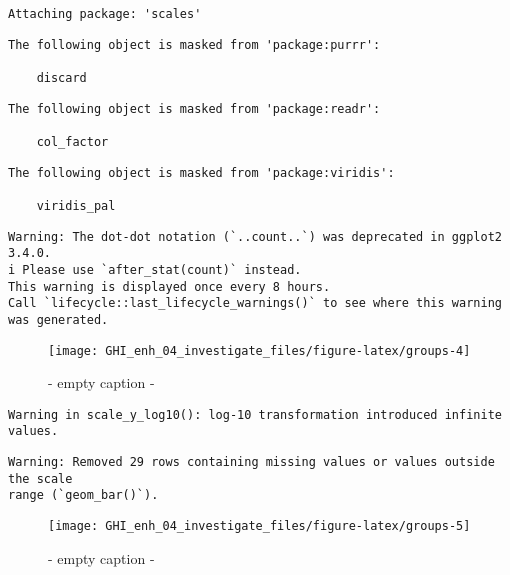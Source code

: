 \documentclass[
  10pt,
  a4paper,oneside]{article}
\begin{document}
\begin{verbatim}
Attaching package: 'scales'
\end{verbatim}

\begin{verbatim}
The following object is masked from 'package:purrr':

    discard
\end{verbatim}

\begin{verbatim}
The following object is masked from 'package:readr':

    col_factor
\end{verbatim}

\begin{verbatim}
The following object is masked from 'package:viridis':

    viridis_pal
\end{verbatim}

\begin{verbatim}
Warning: The dot-dot notation (`..count..`) was deprecated in ggplot2 3.4.0.
i Please use `after_stat(count)` instead.
This warning is displayed once every 8 hours.
Call `lifecycle::last_lifecycle_warnings()` to see where this warning was generated.
\end{verbatim}

\begin{figure}[H]

{\centering \texttt{[image: GHI\_enh\_04\_investigate\_files/figure-latex/groups-4]} 

}

\caption{ - empty caption - }\label{fig:groups-4}
\end{figure}

\begin{verbatim}
Warning in scale_y_log10(): log-10 transformation introduced infinite values.
\end{verbatim}

\begin{verbatim}
Warning: Removed 29 rows containing missing values or values outside the scale
range (`geom_bar()`).
\end{verbatim}

\begin{figure}[H]

{\centering \texttt{[image: GHI\_enh\_04\_investigate\_files/figure-latex/groups-5]} 

}

\caption{ - empty caption - }\label{fig:groups-5}
\end{figure}
\end{document}
